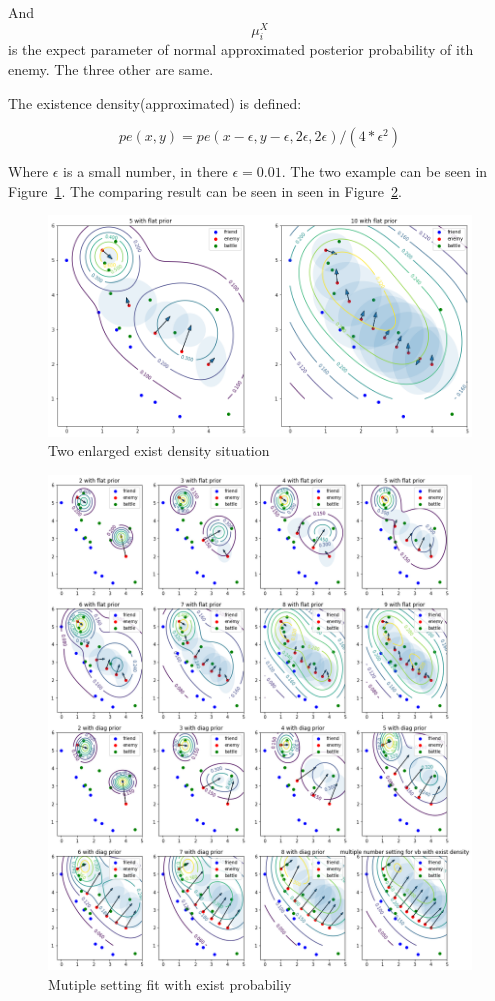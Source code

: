 \documentclass{article}
\begin{document}
And $$\mu^X_i$$ is the expect parameter of normal approximated posterior probability of ith enemy.
The three other are same.

The existence density(approximated) is defined:

$$
pe(x,y) = pe(x-\epsilon,y-\epsilon,2\epsilon,2\epsilon)/(4*\epsilon^2)
$$

Where $\epsilon$ is a small number, in there $\epsilon=0.01$. 
The two example can be seen in Figure~\ref{fig:existDensity}. 
The comparing result can be seen in seen in Figure~\ref{fig:bigVbExist}.

\begin{figure}[h]
\includegraphics[width=0.99\linewidth]{exist_density.png}
\caption{Two enlarged exist density situation}
\label{fig:existDensity}
\end{figure}


\begin{figure}[h]
\includegraphics[width=0.99\linewidth]{big_vb_exist_prob.png}
\caption{Mutiple setting fit with exist probabiliy}
\label{fig:bigVbExist}
\end{figure}
\end{document}
